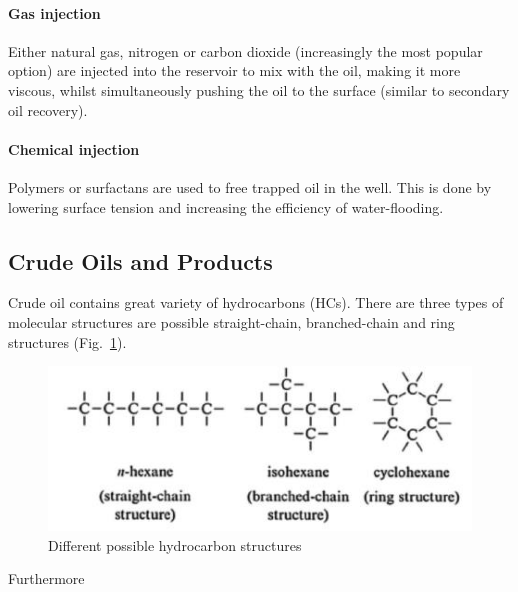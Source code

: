 \paragraph{Gas injection} 
Either natural gas, nitrogen or carbon dioxide (increasingly the most popular option) are injected into the reservoir to mix with the oil, making it more viscous, whilst simultaneously pushing the oil to the surface (similar to secondary oil recovery).

\paragraph{Chemical injection}  
Polymers or surfactans are used to free trapped oil in the well.
This is done by lowering surface tension and increasing the efficiency of water-flooding.

\subsection{Crude Oils and Products}
\label{subsec:crude_oils_and_products}
Crude oil contains great variety of hydrocarbons (HCs).
There are three types of molecular structures are possible straight-chain, branched-chain and ring structures (Fig.~\ref{fig:hc_structs}).

\begin{figure}[H]
    \centering
    \includegraphics{Figures/HC_structures}
    \caption{Different possible hydrocarbon structures}
    \label{fig:hc_structs}
\end{figure}

Furthermore 
